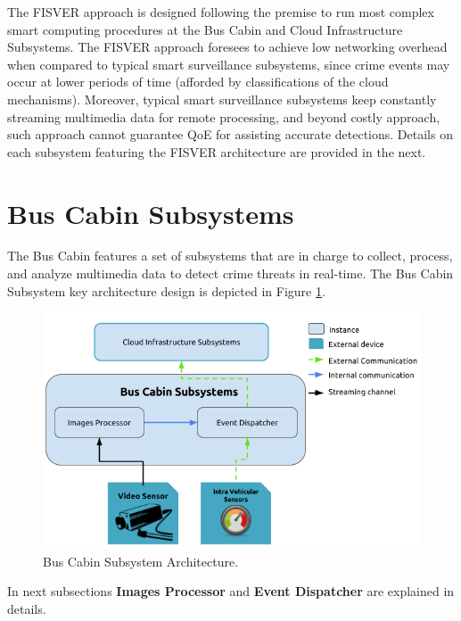 The FISVER approach is designed following the premise to run most complex smart computing procedures at the Bus Cabin and Cloud Infrastructure Subsystems. The FISVER approach foresees to achieve low networking overhead when compared to typical smart surveillance subsystems, since crime events may occur at lower periods of time (afforded by classifications of the cloud mechanisms). Moreover, typical smart surveillance subsystems keep constantly streaming multimedia data for remote processing, and beyond costly approach, such approach cannot guarantee QoE for assisting accurate detections. Details on each subsystem featuring the FISVER architecture are provided in the next.

\section{Bus Cabin Subsystems}

The Bus Cabin features a set of subsystems that are in charge to collect, process, and analyze multimedia data to detect crime threats in real-time. The Bus Cabin Subsystem key architecture design is depicted in Figure \ref{fig:buscabarq}.

\begin{figure}[htb!]
 	\centering
 	\includegraphics[scale=0.65]{Imagens/cap4_bus_cabin.png}
 	\caption{Bus Cabin Subsystem Architecture.}    
 	\label{fig:buscabarq}
\end{figure}
In next subsections \textbf{Images Processor} and \textbf{Event Dispatcher} are explained in details.
%
%
%
%
%
